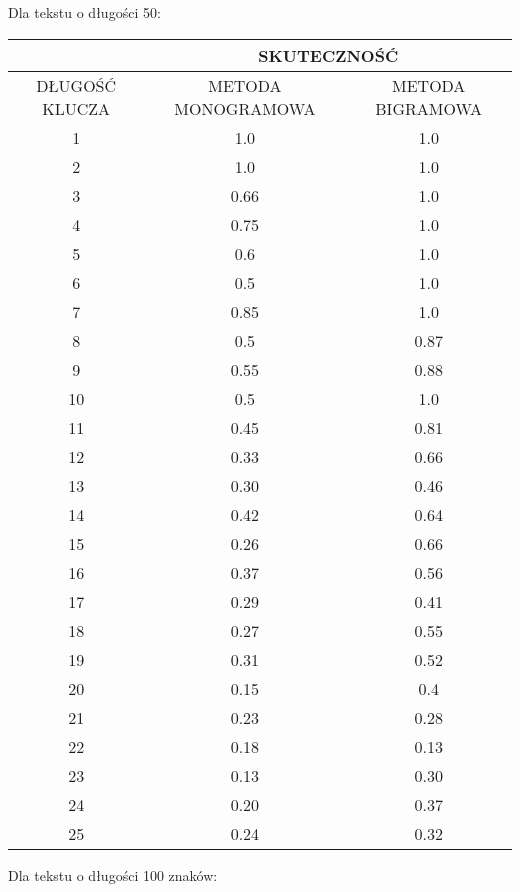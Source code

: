 \documentclass[a4paper]{article}
\begin{document}
Dla tekstu o długości 50:
\begin{center}\begin{tabular}{
|c|c|c|}
\hline   &\multicolumn{2}{|c|}{SKUTECZNOŚĆ} \\
\hline DŁUGOŚĆ KLUCZA & METODA MONOGRAMOWA & METODA BIGRAMOWA\\ \hline
1
 & 1.0 & 1.0\\ \hline
2
 & 1.0 & 1.0\\ \hline
3
 & 0.66 & 1.0\\ \hline
4
 & 0.75 & 1.0\\ \hline
5
 & 0.6 & 1.0\\ \hline
6
 & 0.5 & 1.0\\ \hline
7
 & 0.85 & 1.0\\ \hline
8
 & 0.5 & 0.87\\ \hline
9
 & 0.55 & 0.88\\ \hline
10
 & 0.5 & 1.0\\ \hline
11
 & 0.45 & 0.81\\ \hline
12
 & 0.33 & 0.66\\ \hline
13
 & 0.30 & 0.46\\ \hline
14
 & 0.42 & 0.64\\ \hline
15
 & 0.26 & 0.66\\ \hline
16
 & 0.37 & 0.56\\ \hline
17
 & 0.29 & 0.41\\ \hline
18
 & 0.27 & 0.55\\ \hline
19
 & 0.31 & 0.52\\ \hline
20
 & 0.15 & 0.4\\ \hline
21
 & 0.23 & 0.28\\ \hline
22
 & 0.18 & 0.13\\ \hline
23
 & 0.13 & 0.30\\ \hline
24
 & 0.20 & 0.37\\ \hline
25
 & 0.24 & 0.32\\ \hline
\end{tabular}\end{center}
Dla tekstu o długości 100 znaków:
\end{document}
